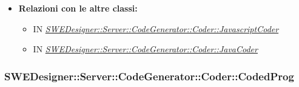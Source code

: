 \documentclass[../DefinizioneDiProdotto.tex]{subfiles}
\begin{document}
\begin{itemize}
				\item \textbf{Relazioni con le altre classi:}
				\begin{itemize}
					\item IN \hyperlink{SWEDesigner::Server::CodeGenerator::Coder::JavascriptCoder}{\emph{SWEDesigner::Server::CodeGenerator::Coder::JavascriptCoder}}
					\item IN \hyperlink{SWEDesigner::Server::CodeGenerator::Coder::JavaCoder}{\emph{SWEDesigner::Server::CodeGenerator::Coder::JavaCoder}}
				\end{itemize}	
			\end{itemize}
			
			
			\subsubsection{SWEDesigner::Server::CodeGenerator::Coder::CodedProg}
			\hypertarget{SWEDesigner::Server::CodeGenerator::Coder::CodedProg}{}
\end{document}
